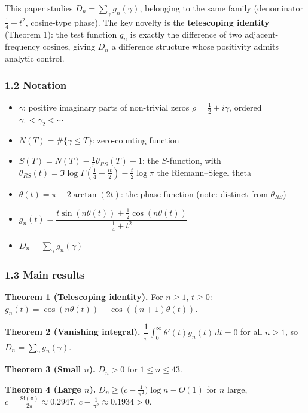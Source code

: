 \documentclass[
]{article}
\providecommand{\tightlist}{%
  \setlength{\itemsep}{0pt}\setlength{\parskip}{0pt}}
\begin{document}
This paper studies \(D_n = \sum_\gamma g_n(\gamma)\), belonging to the
same family (denominator \(\tfrac14+t^2\), cosine-type phase). The key
novelty is the \textbf{telescoping identity} (Theorem 1): the test
function \(g_n\) is exactly the difference of two adjacent-frequency
cosines, giving \(D_n\) a difference structure whose positivity admits
analytic control.

\hypertarget{notation}{%
\subsubsection{1.2 Notation}\label{notation}}

\begin{itemize}
\tightlist
\item
  \(\gamma\): positive imaginary parts of non-trivial zeros
  \(\rho = \tfrac12+i\gamma\), ordered \(\gamma_1 < \gamma_2 < \cdots\)
\item
  \(N(T) = \#\{\gamma \le T\}\): zero-counting function
\item
  \(S(T) = N(T) - \frac1\pi\theta_{RS}(T) - 1\): the \(S\)-function,
  with
  \(\theta_{RS}(t) = \Im\log\Gamma(\tfrac14 + \tfrac{it}{2}) - \tfrac t2\log\pi\)
  the Riemann--Siegel theta
\item
  \(\theta(t) = \pi - 2\arctan(2t)\): the phase function (note: distinct
  from \(\theta_{RS}\))
\item
  \(g_n(t) = \dfrac{t\sin(n\theta(t)) + \tfrac12\cos(n\theta(t))}{\tfrac14 + t^2}\)
\item
  \(D_n = \sum_\gamma g_n(\gamma)\)
\end{itemize}

\hypertarget{main-results}{%
\subsubsection{1.3 Main results}\label{main-results}}

\textbf{Theorem 1 (Telescoping identity).} For \(n \ge 1\), \(t \ge 0\):
\(g_n(t) = \cos(n\theta(t)) - \cos((n+1)\theta(t))\).

\textbf{Theorem 2 (Vanishing integral).}
\(\dfrac1\pi\int_0^\infty \theta'(t)g_n(t)\,dt = 0\) for all
\(n \ge 1\), so \(D_n = \sum_\gamma g_n(\gamma)\).

\textbf{Theorem 3 (Small \(n\)).} \(D_n > 0\) for \(1 \le n \le 43\).

\textbf{Theorem 4 (Large \(n\)).}
\(D_n \ge \big(c - \tfrac{1}{\pi^2}\big)\log n - O(1)\) for \(n\) large,
\(c = \tfrac{\mathrm{Si}(\pi)}{2\pi} \approx 0.2947\),
\(c - \tfrac{1}{\pi^2} \approx 0.1934 > 0\).
\end{document}
